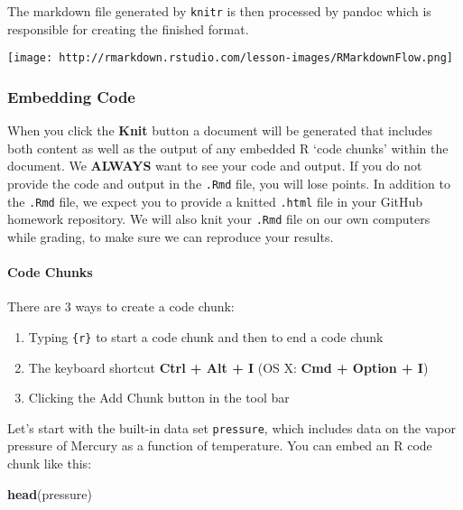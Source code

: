 \documentclass[
]{article}
\newenvironment{Shaded}{\begin{snugshade}}{\end{snugshade}}
\newcommand{\KeywordTok}[1]{\textcolor[rgb]{0.13,0.29,0.53}{\textbf{#1}}}
\newcommand{\NormalTok}[1]{#1}
\providecommand{\tightlist}{%
  \setlength{\itemsep}{0pt}\setlength{\parskip}{0pt}}
\begin{document}
The markdown file generated by \texttt{knitr} is then processed by
pandoc which is responsible for creating the finished format.

\texttt{[image: http://rmarkdown.rstudio.com/lesson-images/RMarkdownFlow.png]}

\hypertarget{embedding-code}{%
\subsubsection{Embedding Code}\label{embedding-code}}

When you click the \textbf{Knit} button a document will be generated
that includes both content as well as the output of any embedded R `code
chunks' within the document. We \textbf{ALWAYS} want to see your code
and output. If you do not provide the code and output in the
\texttt{.Rmd} file, you will lose points. In addition to the
\texttt{.Rmd} file, we expect you to provide a knitted \texttt{.html}
file in your GitHub homework repository. We will also knit your
\texttt{.Rmd} file on our own computers while grading, to make sure we
can reproduce your results.

\hypertarget{code-chunks}{%
\paragraph{Code Chunks}\label{code-chunks}}

There are 3 ways to create a code chunk:

\begin{enumerate}
\def\labelenumi{\arabic{enumi}.}
\tightlist
\item
  Typing
  \texttt{\textasciigrave{}\textasciigrave{}\textasciigrave{}\{r\}} to
  start a code chunk and then
  \texttt{\textasciigrave{}\textasciigrave{}\textasciigrave{}} to end a
  code chunk\\
\item
  The keyboard shortcut \textbf{Ctrl + Alt + I} (OS X: \textbf{Cmd +
  Option + I})\\
\item
  Clicking the Add Chunk button in the tool bar
\end{enumerate}

Let's start with the built-in data set \texttt{pressure}, which includes
data on the vapor pressure of Mercury as a function of temperature. You
can embed an R code chunk like this:

\begin{Shaded}
\begin{Highlighting}[]
\KeywordTok{head}\NormalTok{(pressure)}
\end{Highlighting}
\end{Shaded}
\end{document}

